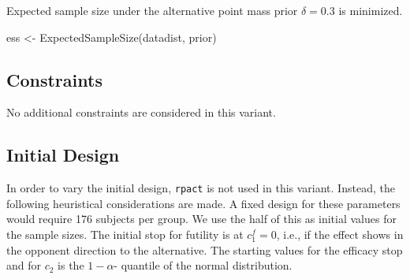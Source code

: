 \documentclass[
]{book}
\newenvironment{Shaded}{\begin{snugshade}}{\end{snugshade}}
\newcommand{\FunctionTok}[1]{\textcolor[rgb]{0.00,0.00,0.00}{#1}}
\newcommand{\NormalTok}[1]{#1}
\newcommand{\OtherTok}[1]{\textcolor[rgb]{0.56,0.35,0.01}{#1}}
\begin{document}
Expected sample size under the alternative point mass prior \(\delta = 0.3\)
is minimized.

\begin{Shaded}
\begin{Highlighting}[]
\NormalTok{ess }\OtherTok{\textless{}{-}} \FunctionTok{ExpectedSampleSize}\NormalTok{(datadist, prior)}
\end{Highlighting}
\end{Shaded}

\hypertarget{constraints-10}{%
\subsection{Constraints}\label{constraints-10}}

No additional constraints are considered in this variant.

\hypertarget{initial-design-8}{%
\subsection{Initial Design}\label{initial-design-8}}

In order to vary the initial design, \texttt{rpact} is not used in this variant.
Instead, the following heuristical considerations are made.
A fixed design for these parameters would require
176
subjects per group. We use the half of this as initial values for the
sample sizes.
The initial stop for futility is at \(c_1^f=0\), i.e., if the effect shows
in the opponent direction to the alternative.
The starting values for the efficacy stop and for \(c_2\) is the \(1-\alpha\)-
quantile of the normal distribution.
\end{document}
